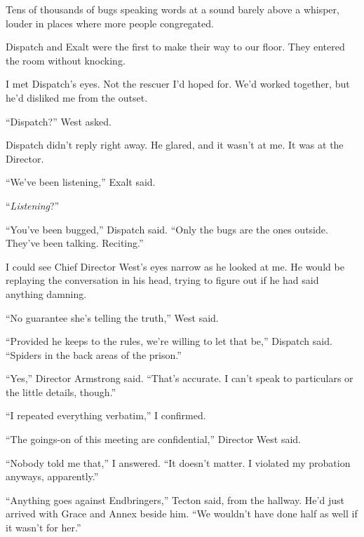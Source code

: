 Tens of thousands of bugs speaking words at a sound barely above a whisper, louder in places where more people congregated.



Dispatch and Exalt were the first to make their way to our floor.  They entered the room without knocking.



I met Dispatch's eyes.  Not the rescuer I'd hoped for.  We'd worked together, but he'd disliked me from the outset.



``Dispatch?''  West asked.



Dispatch didn't reply right away.  He glared, and it wasn't at me.  It was at the Director.



``We've been listening,'' Exalt said.



``\emph{Listening}?''



``You've been bugged,'' Dispatch said.  ``Only the bugs are the ones outside.  They've been talking.  Reciting.''



I could see Chief Director West's eyes narrow as he looked at me.  He would be replaying the conversation in his head, trying to figure out if he had said anything damning.



``No guarantee she's telling the truth,'' West said.



``Provided he keeps to the rules, we're willing to let that be,'' Dispatch said.  ``Spiders in the back areas of the prison.''



``Yes,'' Director Armstrong said.  ``That's accurate.  I can't speak to particulars or the little details, though.''



``I repeated everything verbatim,'' I confirmed.



``The goings-on of this meeting are confidential,'' Director West said.



``Nobody told me that,'' I answered.  ``It doesn't matter.  I violated my probation anyways, apparently.''



``Anything goes against Endbringers,'' Tecton said, from the hallway.  He'd just arrived with Grace and Annex beside him.  ``We wouldn't have done half as well if it wasn't for her.''



